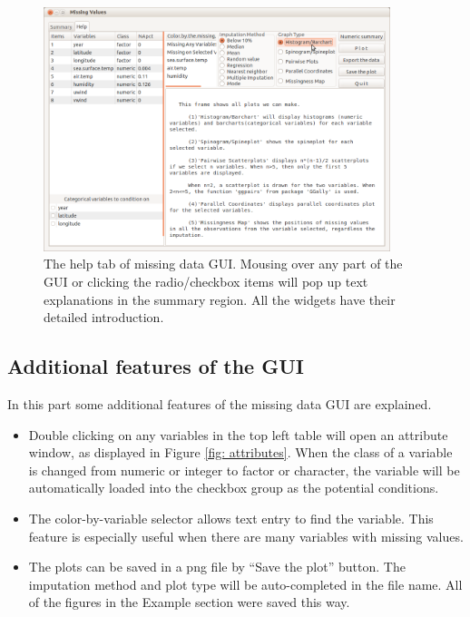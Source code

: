 \documentclass[article]{jss}
\begin{document}
\begin{center}
\begin{figure}[h]
\begin{centering}
\includegraphics[width=0.9\textwidth]{fig8}
\par\end{centering}
\caption{The help tab of missing data GUI. Mousing over any part of the GUI or clicking the radio/checkbox items will pop up text explanations in the summary region. All the widgets have their detailed introduction.}
\label{fig: missingGUI-help}
\end{figure}
\par\end{center}


\subsection{Additional features of the GUI}
In this part some additional features of the missing data GUI are explained.
\begin{itemize}
\item Double clicking on any variables in the top left table will open an attribute window, as displayed in Figure \ref{fig: attributes}. When the class of a variable is changed from numeric or integer to factor or character, the variable will be automatically loaded into the checkbox group as the potential conditions.
\item The color-by-variable selector allows text entry to find the variable. This feature is especially useful when there are many variables with missing values.
\item The plots can be saved in a png file by ``Save the plot'' button. The imputation method and plot type will be auto-completed in the file name. All of the figures in the Example section were saved this way.
\end{itemize}
\end{document}
